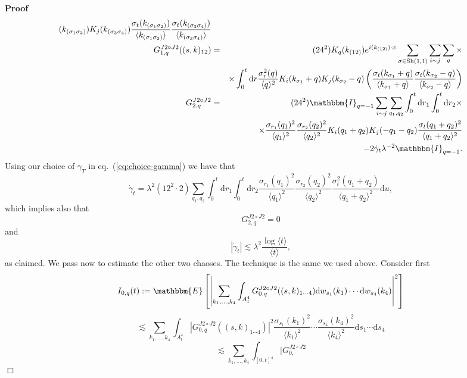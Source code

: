 \documentclass[11pt, oneside]{article}   	%
\newcommand{\assign}{:=}
\newcommand{\mathd}{\mathrm{d}}
\newcommand{\tmop}[1]{\ensuremath{\operatorname{#1}}}
\newenvironment{proof}{\noindent\textbf{Proof\ }}{\hspace*{\fill}$\Box$\medskip}
\begin{document}
\begin{proof}
\begin{eqnarray}
    (k_{(\sigma_1 \sigma_2)}) K_j (k_{(\sigma_3 \sigma_4)}) \frac{\sigma_t
    (k_{(\sigma_1 \sigma_2)})}{\langle k_{(\sigma_1 \sigma_2)} \rangle}
    \frac{\sigma_t (k_{(\sigma_3 \sigma_4)})}{\langle k_{(\sigma_3 \sigma_4)}
    \rangle} \nonumber\\
    G^{J 2 \circ J 2}_{1, q} ((s, k)_{12}) & = & (24^2) K_q (k_{(12)}) e^{i
    (k_{(12)}) \cdot x} \sum_{\sigma \in \tmop{Sh} (1, 1)} \sum_{i \sim j}
    \sum_q \times \nonumber\\
    &  & \times \int_0^t \mathd r \frac{\sigma_r^2 (q)}{\langle q \rangle^2}
    K_i (k_{\sigma_1} + q) K_j (k_{\sigma_2} - q) \left( \frac{\sigma_t
    (k_{\sigma_1} + q)}{\langle k_{\sigma_1} + q \rangle} \frac{\sigma_t
    (k_{\sigma_2} - q)}{\langle k_{\sigma_2} - q \rangle} \right) \nonumber\\
    G^{J 2 \circ J 2}_{2, q} & = & (24^2) \mathbbm{I}_{q = - 1}  \sum_{i \sim
    j} \sum_{q_1, q_2} \int_0^t \mathd r_1 \int_0^t \mathd r_2 \times
    \nonumber\\
    &  & \times \frac{\sigma_{r_1} (q_1)^2}{\langle q_1 \rangle^2}
    \frac{\sigma_{r_2} (q_2)^2}{\langle q_2 \rangle^2} K_i (q_1 + q_2) K_j (-
    q_1 - q_2) \frac{\sigma_t (q_1 + q_2)^2}{\langle q_1 + q_2 \rangle^2}
    \nonumber\\
    &  & - 2 \dot{\gamma}_t \lambda^{- 2} \mathbbm{I}_{q = - 1} . \nonumber
  \end{eqnarray}
  Using our choice of $\gamma_T$ in eq.~(\ref{eq:choice-gamma}) we have that
  \[ \dot{\gamma}_t = \lambda^2 (12^2 \cdot 2) \sum_{q_1, q_2} \int_0^t \mathd
     r_1 \int_0^t \mathd r_2 \frac{\sigma_{r_1} (q_1)^2}{\langle q_1
     \rangle^2} \frac{\sigma_{r_2} (q_2)^2}{\langle q_2 \rangle^2}
     \frac{\sigma_t^2 (q_1 + q_2)}{\langle q_1 + q_2 \rangle^2} \mathd u, \]
  which implies also that
  \[ G^{J 2 \circ J 2}_{2, q} = 0 \]
  and
  \[ | \dot{\gamma}_t | \lesssim \lambda^2 \frac{\log \langle t
     \rangle}{\langle t \rangle}, \]
  as claimed. We pass now to estimate the other two chaoses. The technique is
  the same we used above. Consider first
  \[ I_{0, q} (t) \assign \mathbbm{E} \left[ \left| \sum_{k_1, \ldots, k_4}
     \int_{A_t^4} G^{J 2 \circ J 2}_{0, q} ((s, k)_{1 \cdots 4}) \mathd
     w_{s_1} (k_1) \cdots \mathd w_{s_4} (k_4) \right|^2 \right] \]
  \[ \lesssim \sum_{k_1, \ldots, k_4} \int_{A_t^4} | G^{J 2 \circ J 2}_{0, q}
     ((s, k)_{1 \cdots 4}) |^2 \frac{\sigma_{s_1} (k_1)^2}{\langle k_1
     \rangle^2} \cdots \frac{\sigma_{s_4} (k_4)^2}{\langle k_4 \rangle^2}
     \mathd s_1 \cdots \mathd s_4 \]
  \[ \lesssim \sum_{k_1, \ldots, k_4} \int_{[0, t]^4} | G^{J 2 \circ J 2}_{0,
}\]
\end{proof}
\end{document}
